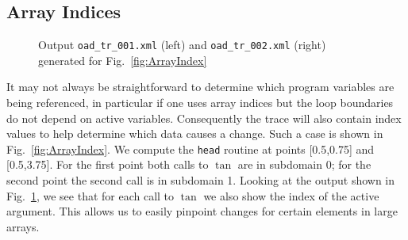 \documentclass{article}
\newcommand{\reffig}[1]{{Fig.~\ref{#1}}}
\begin{document}
\subsection{Array Indices}\label{sec:ArrayIndex}
\begin{figure}
\begin{minipage}{.5\textwidth}

\end{minipage}
\begin{minipage}{.46\textwidth}

\end{minipage}
\caption{Output \lstinline{oad_tr_001.xml} (left) 
and \lstinline{oad_tr_002.xml} (right) 
generated for \reffig{fig:ArrayIndex}}\label{fig:ArrayIndexOutput}
\end{figure}
It may not always be straightforward to determine which program variables 
are being referenced, in particular if one uses array indices but the loop 
boundaries do not depend on active variables. Consequently the trace will 
also contain index values to help determine which data causes a change. 
Such a case is shown in \reffig{fig:ArrayIndex}.
We compute the \lstinline{head} routine at points [0.5,0.75] and [0.5,3.75].
For the first point both calls to $\tan$ are in subdomain 0; for the second 
point the second call is in subdomain 1. Looking at the output shown in \reffig{fig:ArrayIndexOutput},
we see that for each call to $\tan$ we also show the index of the active argument. 
This allows us to easily pinpoint changes for certain elements in large arrays.    
\end{document}
